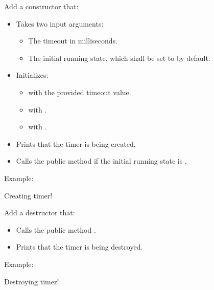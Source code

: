 Add a constructor that:
\begin{itemize}
  \item Takes two input arguments:
  \begin{itemize}
    \item The timeout in milliseconds.
    \item The initial running state, which shall be set to  by default.
  \end{itemize}
  \item Initializes:
  \begin{itemize}
    \item {} with the provided timeout value.
    \item {} with .
    \item {} with .
  \end{itemize}
  \item Prints that the timer is being created.
  \item Calls the public method  if the initial running state is .
\end{itemize}
Example:

\begin{console}
Creating timer!
\end{console}

Add a destructor that:
\begin{itemize}
  \item Calls the public method .
  \item Prints that the timer is being destroyed.
\end{itemize}
Example:

\begin{console}
Destroying timer!
\end{console}

